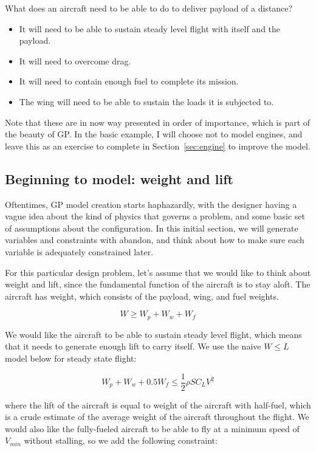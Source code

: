 What does an aircraft need to be able to do to deliver payload of a distance?
\begin{itemize}
	\item It will need to be able to sustain steady
    level flight with itself and the payload.
    \item It will need to overcome drag.
	\item It will need to contain enough fuel to complete its mission.
	\item The wing will need to be able to sustain the loads it is
    subjected to.
\end{itemize}

Note that these are in now way presented in order of importance, which is part of
the beauty of \gls{GP}. In the basic example, I will choose not to model engines,
and leave this as an exercise
to complete in Section~\ref{sec:engine} to improve the model.

\subsection{Beginning to model: weight and lift}

Oftentimes, GP model creation starts haphazardly, with the designer having a
vague idea about the kind of physics that governs a problem, and some basic
set of assumptions about the configuration. In this initial section, we will
generate variables and constraints with abandon, and think about how to make
sure each variable is adequately constrained later.

For this particular design problem, let's assume that we would like to think about
weight and lift, since the fundamental function of the aircraft is to stay aloft.
The aircraft has weight, which consists of the payload, wing, and fuel weights. 

\begin{equation}
    W \geq W_p + W_w + W_f
\end{equation}

We would like the aircraft to be able to sustain steady level flight, which means 
that it needs to generate enough lift to carry itself. We use the naive $W \leq L$ 
model below for steady state flight:

\begin{equation}
    W_p + W_w + 0.5 W_f \leq \frac{1}{2} \rho S C_L V^2
\end{equation}

where the lift of the aircraft is equal to weight of the aircraft with half-fuel, 
which is a crude estimate of the average weight of the aircraft throughout the flight. 
We would also like the fully-fueled aircraft to be able to fly at a minimum speed 
of $V_{min}$ without stalling, so we add the following constraint:

